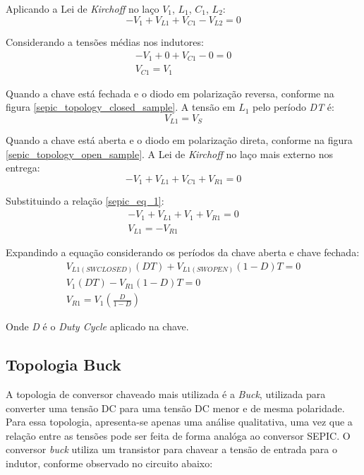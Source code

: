 Aplicando a Lei de \textit{Kirchoff} no laço $V_{1}$, $L_{1}$, $C_{1}$, $L_{2}$:
\begin{equation}
    - V_{1} + V_{L1} + V_{C1} - V_{L2} = 0
\end{equation}

Considerando a tensões médias nos indutores:
\begin{equation}
    \begin{split}
        - V_{1} + 0 + V_{C1} - 0 = 0 \\ V_{C1} = V_{1}
    \end{split}
    \label{sepic_eq_1}
\end{equation}

Quando a chave está fechada e o diodo em polarização reversa, conforme na figura \ref{sepic_topology_closed_sample}. A tensão em $L_{1}$ pelo período \textit{DT} é:
\begin{equation}
    V_{L1} = V_{S}
\end{equation}

Quando a chave está aberta e o diodo em polarização direta, conforme na figura \ref{sepic_topology_open_sample}. A Lei de \textit{Kirchoff} no laço mais externo nos entrega:
\begin{equation}
    -V_{1} + V_{L1} + V_{C1} + V_{R1} = 0
\end{equation}

Substituindo a relação \ref{sepic_eq_1}:
\begin{equation}
    \begin{split}
        -V_{1} + V_{L1} + V_{1} + V_{R1} = 0 \\
        V_{L1} = - V_{R1}
    \end{split}
    \label{sepic_eq_2}
\end{equation}

Expandindo a equação considerando os períodos da chave aberta e chave fechada:
\begin{equation}
    \begin{split}
        V_{L1 (SW CLOSED)} (DT) + V_{L1 (SW OPEN)} (1-D)T = 0\\
        V_{1}(DT) - V_{R1}(1-D)T = 0\\
        V_{R1} = V_{1} (\frac{D}{1-D})
    \end{split}
\end{equation}

Onde \textit{D} é o \textit{Duty Cycle} aplicado na chave.

\subsection*{Topologia Buck}
A topologia de conversor chaveado mais utilizada é a \textit{Buck}, utilizada para converter uma tensão DC para uma tensão DC menor e de mesma polaridade. Para essa topologia, apresenta-se apenas uma análise qualitativa, uma vez que a relação entre as tensões pode ser feita de forma analóga ao conversor SEPIC. O conversor \textit{buck} utiliza um transistor para chavear a tensão de entrada para o indutor, conforme observado no circuito abaixo:

